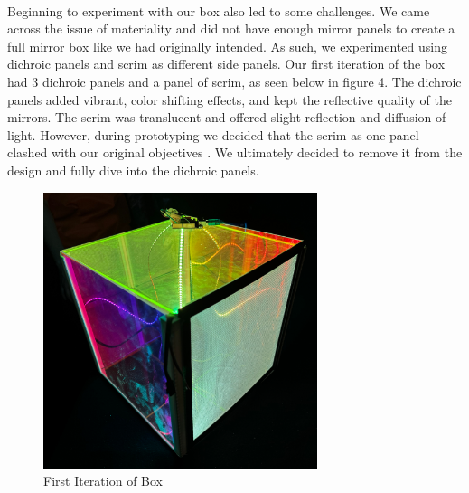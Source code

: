 \documentclass{article}
\begin{document}
\paragraph{}Beginning to experiment with our box also led to some challenges. We came across the issue of materiality and did not have enough mirror panels to create a full mirror box like we had originally intended. As such, we experimented using dichroic panels and scrim as different side panels. Our first iteration of the box had 3 dichroic panels and a panel of scrim, as seen below in figure 4. The dichroic panels added vibrant, color shifting effects, and kept the reflective quality of the mirrors. The scrim was translucent and offered slight reflection and diffusion of light. However, during prototyping we decided that the scrim as one panel clashed with our original objectives . We ultimately decided to remove it from the design and fully dive into the dichroic panels.
\begin{figure}
    \centering
    \includegraphics[width=0.7143\textwidth]{1st.png}
    \caption{First Iteration of Box}
\end{figure}
\end{document}
